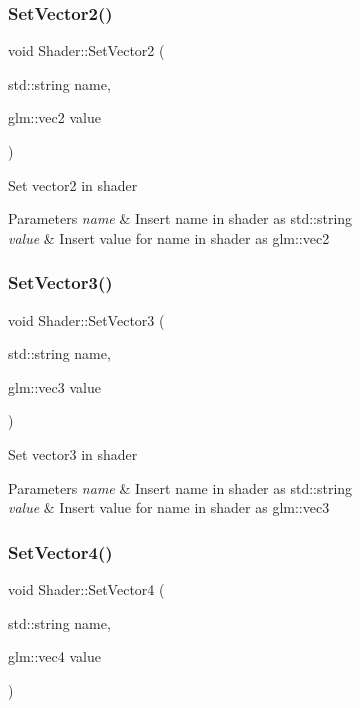\subsubsection{\texorpdfstring{SetVector2()}{SetVector2()}}
{\footnotesize\ttfamily void Shader\+::\+Set\+Vector2 (\begin{DoxyParamCaption}\item[{std\+::string}]{name,  }\item[{glm\+::vec2}]{value }\end{DoxyParamCaption})}

Set vector2 in shader 
\begin{DoxyParams}{Parameters}
{\em name} & Insert name in shader as std\+::string \\
\hline
{\em value} & Insert value for \textquotesingle{}name\textquotesingle{} in shader as glm\+::vec2 \\
\hline
\end{DoxyParams}
\mbox{\label{class_shader_aa9d9c1159e1ebaf60d09d4763523efd3}} 
\subsubsection{\texorpdfstring{SetVector3()}{SetVector3()}}
{\footnotesize\ttfamily void Shader\+::\+Set\+Vector3 (\begin{DoxyParamCaption}\item[{std\+::string}]{name,  }\item[{glm\+::vec3}]{value }\end{DoxyParamCaption})}

Set vector3 in shader 
\begin{DoxyParams}{Parameters}
{\em name} & Insert name in shader as std\+::string \\
\hline
{\em value} & Insert value for \textquotesingle{}name\textquotesingle{} in shader as glm\+::vec3 \\
\hline
\end{DoxyParams}
\mbox{\label{class_shader_a43443ff13fc01862d40930b6a6d312b3}} 
\subsubsection{\texorpdfstring{SetVector4()}{SetVector4()}}
{\footnotesize\ttfamily void Shader\+::\+Set\+Vector4 (\begin{DoxyParamCaption}\item[{std\+::string}]{name,  }\item[{glm\+::vec4}]{value }\end{DoxyParamCaption})}

